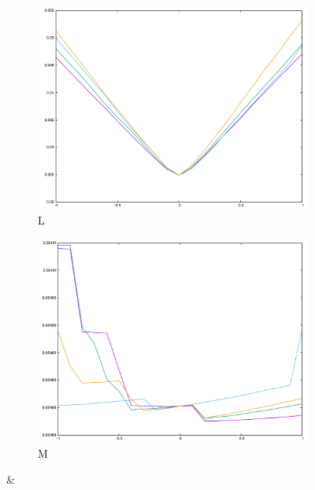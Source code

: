 \begin{figure}[H]
\begin{subfigure}{.33\textwidth}
\end{subfigure}\\
\begin{subfigure}{.33\textwidth}
	\includegraphics[width=\linewidth]{fig/ajherr/t3rr/L_mae.pdf}
	\caption{L}
\end{subfigure}%
\begin{subfigure}{.33\textwidth}
	\includegraphics[width=\linewidth]{fig/ajherr/t3rr/M_mae.pdf}
	\caption{M}
\end{subfigure}&
\begin{subfigure}{.33\textwidth}

\end{subfigure}
\end{figure}
